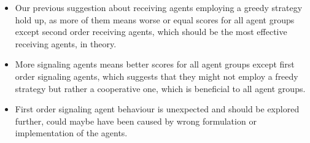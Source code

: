 \begin{itemize}
    \item Our previous suggestion about receiving agents employing a greedy strategy hold up, as more of them means worse or equal scores for all agent groups except second order receiving agents, which should be the most effective receiving agents, in theory.
    \item More signaling agents means better scores for all agent groups except first order signaling agents, which suggests that they might not employ a freedy strategy but rather a cooperative one, which is beneficial to all agent groups.
    \item First order signaling agent behaviour is unexpected and should be explored further, could maybe have been caused by wrong formulation or implementation of the agents.
\end{itemize}